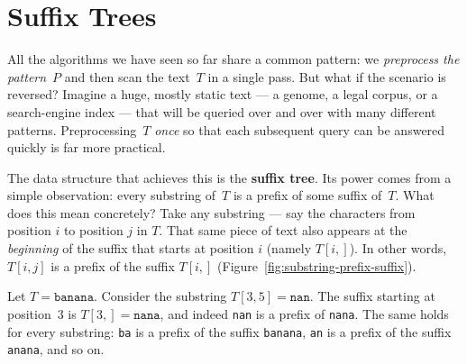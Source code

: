 
\section{Suffix Trees}

All the algorithms we have seen so far share a common pattern: we
\emph{preprocess the pattern}~$P$ and then scan the text~$T$ in a single
pass.
But what if the scenario is reversed?
Imagine a huge, mostly static text --- a genome, a legal corpus, or a
search-engine index --- that will be queried over and over with many
different patterns.
Preprocessing~$T$ \emph{once} so that each subsequent query can be
answered quickly is far more practical.


The data structure that achieves this is the \textbf{suffix tree}.
Its power comes from a simple observation: every substring of~$T$ is a
prefix of some suffix of~$T$.
What does this mean concretely?
Take any substring --- say the characters from position $i$ to position
$j$ in $T$.
That same piece of text also appears at the \emph{beginning} of the
suffix that starts at position $i$ (namely $T[i{,}]$).
In other words, $T[i,j]$ is a prefix of the suffix $T[i{,}]$
(Figure~\ref{fig:substring-prefix-suffix}).

\begin{example}
  Let $T = \texttt{banana}$.
  Consider the substring $T[3,5] = \texttt{nan}$.
  The suffix starting at position~3 is $T[3{,}] = \texttt{nana}$, and
  indeed \texttt{nan} is a prefix of \texttt{nana}.
  The same holds for every substring: \texttt{ba} is a prefix of the
  suffix \texttt{banana}, \texttt{an} is a prefix of the suffix
  \texttt{anana}, and so on.
\end{example}

